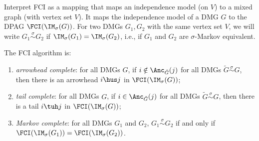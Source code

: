 Interpret FCI as a mapping that maps an independence model (on $V$) to a mixed graph (with vertex set $V$).
It maps the independence model of a DMG $G$ to the DPAG $\FCI(\IM_\sigma(G))$.
For two DMGs $G_1,G_2$ with the same vertex set $V$, we will write $G_1 \stackrel{\sigma}{\sim} G_2$ if $\IM_\sigma(G_1) = \IM_\sigma(G_2)$, i.e., if $G_1$ and $G_2$ are $\sigma$-Markov equivalent.
\begin{Thm}\label{thm:fci_sound_complete}
The FCI algorithm is:
  \begin{enumerate}[label=(\roman*)]
    \item \emph{arrowhead complete}: for all DMGs $G$, if $i \notin \Anc_{\tilde{G}}(j)$ for all DMGs $\tilde{G} \stackrel{\sigma}{\sim} G$, then there is an arrowhead $i \hus j$ in $\FCI(\IM_\sigma(G))$;
    \item \emph{tail complete}: for all DMGs $G$, if $i \in \Anc_{\tilde{G}}(j)$ for all DMGs $\tilde{G} \stackrel{\sigma}{\sim} G$, then there is a tail $i \tuh j$ in $\FCI(\IM_\sigma(G))$;
    \item \emph{Markov complete}: for all DMGs $G_1$ and $G_2$, $G_1 \stackrel{\sigma}{\sim} G_2$ if and only if $\FCI(\IM_\sigma(G_1)) = \FCI(\IM_\sigma(G_2))$.
  \end{enumerate}
\end{Thm}
